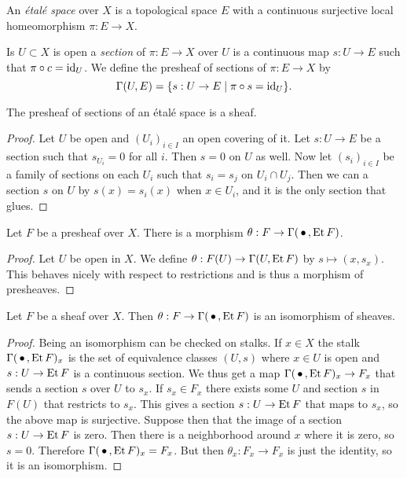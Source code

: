 \begin{defi}
An \emph{\'etal\'e space} over $X$ is a topological space $E$ with a continuous surjective local homeomorphism $\pi : E \to X$.
\end{defi}

Is $U \subset X$ is open a \emph{section} of $\pi : E \to X$ over $U$ is a continuous map $s : U \to E$ such that $\pi \circ c = \operatorname{id}_U$.
We define the presheaf of sections of $\pi : E \to X$ by
\[
\Gamma(U, E)
= \{ s : U \to E \mid \pi \circ s = \operatorname{id}_U \}.
\]

\begin{prop}
The presheaf of sections of an \'etal\'e space is a sheaf.
\end{prop}

\begin{proof}
Let $U$ be open and $(U_i)_{i \in I}$ an open covering of it.
Let $s : U \to E$ be a section such that $s_{U_i} = 0$ for all $i$.
Then $s = 0$ on $U$ as well.
Now let $(s_i)_{i \in I}$ be a family of sections on each $U_i$ such that $s_i = s_j$ on $U_i \cap U_j$.
Then we can a section $s$ on $U$ by $s(x) = s_i(x)$ when $x \in U_i$, and it is the only section that glues.
\end{proof}


\begin{prop}
Let $F$ be a presheaf over $X$.
There is a morphism $\theta : F \to \Gamma(\,\bullet\,, \operatorname{Et} F)$.
\end{prop}

\begin{proof}
Let $U$ be open in $X$.
We define $\theta : F(U) \to \Gamma(U, \operatorname{Et} F)$ by $s \mapsto (x, s_x)$.
This behaves nicely with respect to restrictions and is thus a morphism of presheaves.
\end{proof}


\begin{prop}
Let $F$ be a sheaf over $X$.
Then $\theta : F \to \Gamma( \,\bullet\,, \operatorname{Et} F)$ is an isomorphism of sheaves.
\end{prop}


\begin{proof}
Being an isomorphism can be checked on stalks.
If $x \in X$ the stalk $\Gamma( \,\bullet\,, \operatorname{Et} F)_x$ is the set of equivalence classes $(U, s)$ where $x \in U$ is open and $s : U \to \operatorname{Et} F$ is a continuous section.
We thus get a map $\Gamma( \,\bullet\,, \operatorname{Et} F)_x \to F_x$ that sends a section $s$ over $U$ to $s_x$.
If $s_x \in F_x$ there exists some $U$ and section $s$ in $F(U)$ that restricts to $s_x$.
This gives a section $s : U \to \operatorname{Et} F$ that maps to $s_x$, so the above map is surjective.
Suppose then that the image of a section $s : U \to \operatorname{Et} F$ is zero.
Then there is a neighborhood around $x$ where it is zero, so $s = 0$.
Therefore $\Gamma( \,\bullet\,, \operatorname{Et} F)_x = F_x$.
But then $\theta_x : F_x \to F_x$ is just the identity, so it is an isomorphism.
\end{proof}


